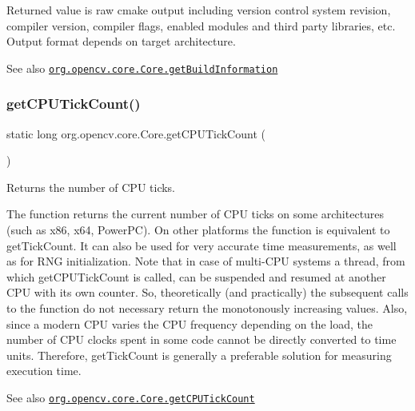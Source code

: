 Returned value is raw cmake output including version control system revision, compiler version, compiler flags, enabled modules and third party libraries, etc. Output format depends on target architecture.

\begin{DoxySeeAlso}{See also}
\href{http://docs.opencv.org/modules/core/doc/utility_and_system_functions_and_macros.html#getbuildinformation}{\tt org.\+opencv.\+core.\+Core.\+get\+Build\+Information} 
\end{DoxySeeAlso}
\mbox{\label{classorg_1_1opencv_1_1core_1_1_core_a63858b4080485f600e39a29c722a7a85}} 
\subsubsection{\texorpdfstring{get\+C\+P\+U\+Tick\+Count()}{getCPUTickCount()}}
{\footnotesize\ttfamily static long org.\+opencv.\+core.\+Core.\+get\+C\+P\+U\+Tick\+Count (\begin{DoxyParamCaption}{ }\end{DoxyParamCaption})\hspace{0.3cm}{\ttfamily [static]}}

Returns the number of C\+PU ticks.

The function returns the current number of C\+PU ticks on some architectures (such as x86, x64, Power\+PC). On other platforms the function is equivalent to {\ttfamily get\+Tick\+Count}. It can also be used for very accurate time measurements, as well as for R\+NG initialization. Note that in case of multi-\/\+C\+PU systems a thread, from which {\ttfamily get\+C\+P\+U\+Tick\+Count} is called, can be suspended and resumed at another C\+PU with its own counter. So, theoretically (and practically) the subsequent calls to the function do not necessary return the monotonously increasing values. Also, since a modern C\+PU varies the C\+PU frequency depending on the load, the number of C\+PU clocks spent in some code cannot be directly converted to time units. Therefore, {\ttfamily get\+Tick\+Count} is generally a preferable solution for measuring execution time.

\begin{DoxySeeAlso}{See also}
\href{http://docs.opencv.org/modules/core/doc/utility_and_system_functions_and_macros.html#getcputickcount}{\tt org.\+opencv.\+core.\+Core.\+get\+C\+P\+U\+Tick\+Count} 
\end{DoxySeeAlso}
\mbox{\label{classorg_1_1opencv_1_1core_1_1_core_a4f58562c2297384087202e154b2b7555}} 
